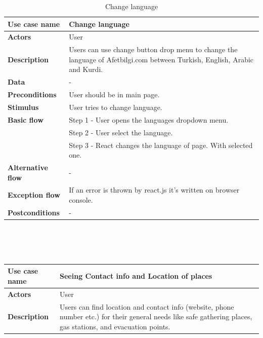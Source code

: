 \begin{center}
    \begin{table}[H]
        \begin{tabular}{| m{3cm}| m{10cm} |}
            \hline
            \textbf{Use case name} & Change language \\
            \hline
            \textbf{Actors} & User\\
            \hline
            \textbf{Description} & Users can use change button drop menu to change the language of Afetbilgi.com between Turkish, English, Arabic and Kurdi.\\
            \hline
            \textbf{Data} & -\\
            \hline
            \textbf{Preconditions} & User should be in main page.\\
            \hline
            \textbf{Stimulus} & User tries to change language. \\
            \hline
            \textbf{Basic flow} & Step 1 - User opens the languages dropdown menu.\\
                                & Step 2 - User select the language.\\
                                & Step 3 - React changes the language of page. With selected one.\\
            \hline
            \textbf{Alternative flow} & - \\
            \hline
            \textbf{Exception flow} & If an error is thrown by react.js it's written on browser console.\\
            \hline
            \textbf{Postconditions} & -\\
            \hline
        \end{tabular}
        \caption[Change language]{Change language}
    \end{table}
    ~\\~\\~\\
    \begin{table}[H]
        \begin{tabular}{| m{3cm}| m{10cm} |}
            \hline
            \textbf{Use case name} & Seeing Contact info and Location of places  \\
            \hline
            \textbf{Actors} & User\\
            \hline
            \textbf{Description} & Users can find location and contact info (website, phone number etc.) for their general needs like safe gathering places, gas stations, and evacuation points.\\

\end{tabular}
\end{table}
\end{center}
